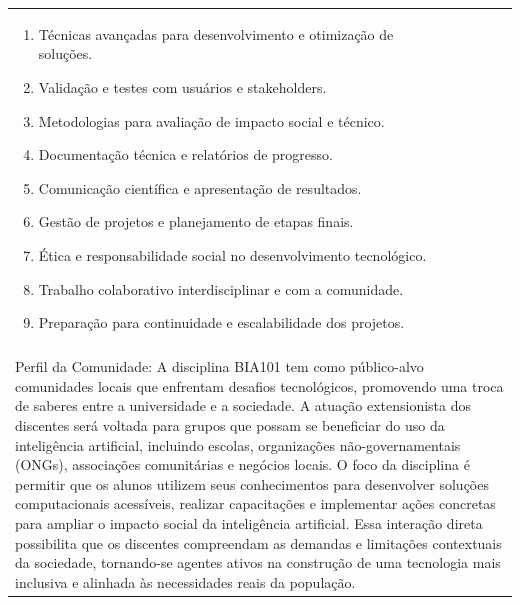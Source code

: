 \documentclass[11pt]{article}
\begin{document}
\begin{center}
\begin{longtable}{|p{4cm}|p{4cm}|p{4cm}|p{4cm}|}
{\begin{enumerate}
\item Técnicas avançadas para desenvolvimento e otimização de soluções.
\item Validação e testes com usuários e stakeholders.
\item Metodologias para avaliação de impacto social e técnico.
\item Documentação técnica e relatórios de progresso.
\item Comunicação científica e apresentação de resultados.
\item Gestão de projetos e planejamento de etapas finais.
\item Ética e responsabilidade social no desenvolvimento tecnológico.
\item Trabalho colaborativo interdisciplinar e com a comunidade.
\item Preparação para continuidade e escalabilidade dos projetos.\end{enumerate}}\\
\multicolumn{4}{|p{\dimexpr 16cm + 6\tabcolsep\relax}|}{}\\
\multicolumn{4}{|p{\dimexpr 16cm + 6\tabcolsep\relax}|}{Perfil da Comunidade: A disciplina BIA101 tem como público-alvo comunidades locais que enfrentam desafios tecnológicos, promovendo uma troca de saberes entre a universidade e a sociedade. A atuação extensionista dos discentes será voltada para grupos que possam se beneficiar do uso da inteligência artificial, incluindo escolas, organizações não-governamentais (ONGs), associações comunitárias e negócios locais. O foco da disciplina é permitir que os alunos utilizem seus conhecimentos para desenvolver soluções computacionais acessíveis, realizar capacitações e implementar ações concretas para ampliar o impacto social da inteligência artificial. Essa interação direta possibilita que os discentes compreendam as demandas e limitações contextuais da sociedade, tornando-se agentes ativos na construção de uma tecnologia mais inclusiva e alinhada às necessidades reais da população.}\\

\end{longtable}
\end{center}
\end{document}
